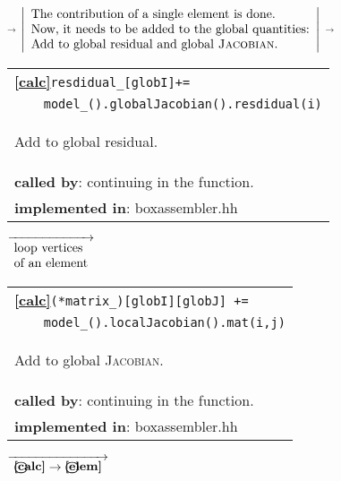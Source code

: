 \begin{landscape}
{\begin{tabular}{|l|}
	\hline 
  \end{tabular}
  {\scriptsize$\overrightarrow{}$ }
  $\left|
     \begin{array}{l}
    \textnormal{The contribution of a single element is done.}\\
    \textnormal{Now, it needs to be added to the global quantities:}\\
    \textnormal{Add to global residual and global \textsc{Jacobian}.}
  \end{array}
  \right |$
    {\scriptsize$\overrightarrow{}$ }
   \begin{tabular}{|l|} 
      \hline 
      \textbf{\textcircled{\ref{calc}}}\verb?resdidual_[globI]+=? \\ 
		  \verb?    model_().globalJacobian().resdidual(i)? \\ 
      \begin{scriptsize}Add to global residual.\end{scriptsize}\\
      \textbf{called by}: continuing in the function. \\ 
      \textbf{implemented in}: boxassembler.hh\\ 
	\hline 
  \end{tabular}
 \nextline
   {\scriptsize$\overrightarrow{ 
    \begin{array}{l} 
    \textnormal{loop vertices}\\
    \textnormal{of an element}
    \end{array}}$}
   \begin{tabular}{|l|} 
      \hline 
      \textbf{\textcircled{\ref{calc}}}\verb?(*matrix_)[globI][globJ] +=? \\ 
		\verb?    model_().localJacobian().mat(i,j)? \\ 
      \begin{scriptsize}Add to global \textsc{Jacobian}.\end{scriptsize}\\
      \textbf{called by}: continuing in the function. \\ 
      \textbf{implemented in}: boxassembler.hh\\ 
	\hline 
  \end{tabular}
    {\scriptsize$\overrightarrow{
	  \begin{array}{l}
	   \textbf{\textcircled{\ref{calc}}}\rightarrow\textbf{\textcircled{\ref{elem}}}\\
           \end{array}
    }$}
   \begin{tabular}{|l|} 

\end{tabular}}
\end{landscape}

